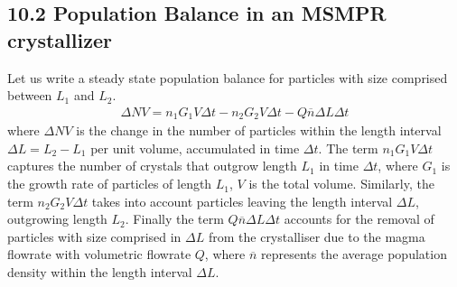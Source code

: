 \documentclass[letterpaper,10pt,english]{jupyterBook}
\begin{document}
\subsection{10.2 Population Balance in an MSMPR crystallizer}
\label{\detokenize{MSMPR_crystallizer:population-balance-in-an-msmpr-crystallizer}}
\sphinxAtStartPar
Let us write a steady state population balance for particles with size comprised between \(L_1\) and \(L_2\).
\begin{equation}\label{equation:MSMPR_crystallizer:MSMPReq4}
\begin{split}
{\Delta{N}}V=n_1G_1V\Delta{t}-n_2G_2V\Delta{t}-Q\overline{n}\Delta{L}\Delta{t}
\end{split}
\end{equation}
\sphinxAtStartPar
where \(\Delta{N}V\) is the change in the number of particles within the length interval \(\Delta{L}=L_2-L_1\) per unit volume, accumulated in time \(\Delta{t}\).
The term \(n_1G_1V\Delta{t}\) captures the number of crystals that outgrow length \(L_1\) in time \(\Delta{t}\), where \(G_1\) is the growth rate of particles of length \(L_1\), \(V\) is the total volume.
Similarly, the term \(n_2G_2V\Delta{t}\) takes into account particles leaving the length  interval \(\Delta{L}\), outgrowing length \(L_2\).
Finally the term \(Q\overline{n}\Delta{L}\Delta{t}\) accounts for the removal of particles with size comprised in  \(\Delta{L}\) from the crystalliser due to the magma flowrate with volumetric flowrate \(Q\), where \(\overline{n}\) represents the average population density within the length interval \(\Delta{L}\).
\end{document}
